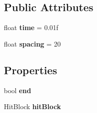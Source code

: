 \subsection*{Public Attributes}
\begin{DoxyCompactItemize}
\item 
\mbox{\label{class_tower_a82ea6ca91315d00b450765abb4223875}} 
float {\bfseries time} = 0.\+01f
\item 
\mbox{\label{class_tower_aa3bc2fcfac5272e356f109d0aedd873d}} 
float {\bfseries spacing} = 20
\end{DoxyCompactItemize}
\subsection*{Properties}
\begin{DoxyCompactItemize}
\item 
\mbox{\label{class_tower_ab6fb4c9cfb1895d6a4785c7b2eb5950f}} 
bool {\bfseries end}
\item 
\mbox{\label{class_tower_a9a3d7e8afc95d30a0c33af8d34a86580}} 
Hit\+Block {\bfseries hit\+Block}
\end{DoxyCompactItemize}
